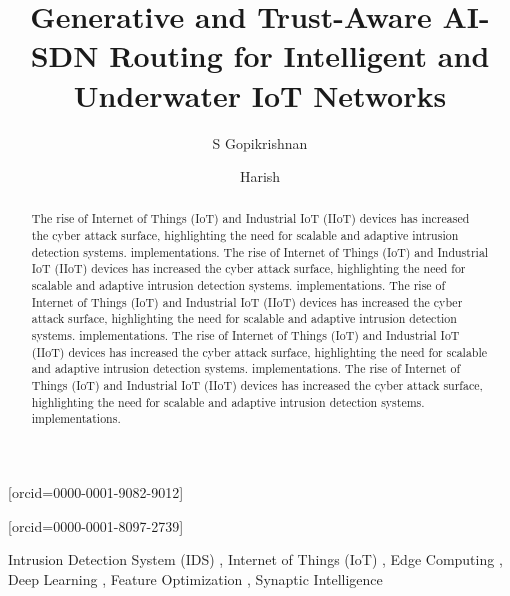 \documentclass[a4paper,fleqn]{cas-dc}
\numberwithin{equation}{section}
\begin{document}
\let\WriteBookmarks\relax
\def\floatpagepagefraction{1}
\def\textpagefraction{.001}


\title [mode = title]{Generative and Trust-Aware AI-SDN Routing for Intelligent and Underwater IoT Networks}                     

\author[1]{S Gopikrishnan}[orcid=0000-0001-9082-9012]
\address[1]{School of Computer Science and Engineering, VIT-AP University, Amaravathi. Andhra Pradesh, India}


\author[1]{Harish} [orcid=0000-0001-8097-2739]








\begin{abstract}
The rise of Internet of Things (IoT) and Industrial IoT (IIoT) devices has increased the cyber attack surface, highlighting the need for scalable and adaptive intrusion detection systems. implementations.
The rise of Internet of Things (IoT) and Industrial IoT (IIoT) devices has increased the cyber attack surface, highlighting the need for scalable and adaptive intrusion detection systems. implementations.
The rise of Internet of Things (IoT) and Industrial IoT (IIoT) devices has increased the cyber attack surface, highlighting the need for scalable and adaptive intrusion detection systems. implementations.
The rise of Internet of Things (IoT) and Industrial IoT (IIoT) devices has increased the cyber attack surface, highlighting the need for scalable and adaptive intrusion detection systems. implementations.
The rise of Internet of Things (IoT) and Industrial IoT (IIoT) devices has increased the cyber attack surface, highlighting the need for scalable and adaptive intrusion detection systems. implementations.
\end{abstract}

\begin{keywords}
Intrusion Detection System (IDS) \sep
Internet of Things (IoT) \sep 
Edge Computing \sep 
Deep Learning \sep 
Feature Optimization \sep 
Synaptic Intelligence
\end{keywords}


\maketitle
\end{document}
